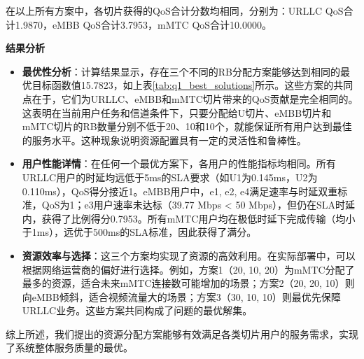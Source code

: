 在以上所有方案中，各切片获得的QoS合计分数均相同，分别为：URLLC QoS合计1.9870，eMBB QoS合计3.7953，mMTC QoS合计10.0000。

\textbf{结果分析}

\begin{itemize}
    \item \textbf{最优性分析}：计算结果显示，存在三个不同的RB分配方案能够达到相同的最优目标函数值15.7823，如上表\ref{tab:q1_best_solutions}所示。这些方案的共同点在于，它们为URLLC、eMBB和mMTC切片带来的QoS贡献是完全相同的。这表明在当前用户任务和信道条件下，只要分配给U切片、eMBB切片和mMTC切片的RB数量分别不低于20、10和10个，就能保证所有用户达到最佳的服务水平。这种现象说明资源配置具有一定的灵活性和鲁棒性。
    \item \textbf{用户性能详情}：在任何一个最优方案下，各用户的性能指标均相同。所有URLLC用户的时延均远低于5ms的SLA要求（如U1为0.145ms，U2为0.110ms），QoS得分接近1。eMBB用户中，e1, e2, e4满足速率与时延双重标准，QoS为1；e3用户速率未达标（39.77 Mbps < 50 Mbps），但仍在SLA时延内，获得了比例得分0.7953。所有mMTC用户均在极低时延下完成传输（均小于1ms），远优于500ms的SLA标准，因此获得了满分。
    \item \textbf{资源效率与选择}：这三个方案均实现了资源的高效利用。在实际部署中，可以根据网络运营商的偏好进行选择。例如，方案1（20, 10, 20）为mMTC分配了最多的资源，适合未来mMTC连接数可能增加的场景；方案2（20, 20, 10）则向eMBB倾斜，适合视频流量大的场景；方案3（30, 10, 10）则最优先保障URLLC业务。这些方案共同构成了问题的最优解集。
\end{itemize}

综上所述，我们提出的资源分配方案能够有效满足各类切片用户的服务需求，实现了系统整体服务质量的最优。